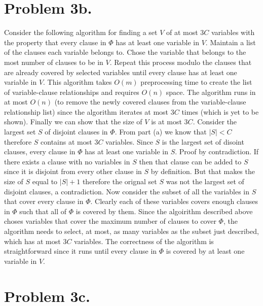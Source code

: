 \documentclass[12pt]{article}
\begin{document}
\section*{Problem 3b.}
Consider the following algorithm for finding a set $V$ of at most $3C$ variables
with the property that every clause in $\Phi$ has at least one variable in $V$.
Maintain a list of the clauses each variable belongs to. Chose the variable that
belongs to the most number of clauses to be in $V$. Repeat this process modulo
the clauses that are already covered by selected variables until every clause
has at least one variable in $V$. This algorithm takes $O(m)$ preprocessing time
to create the list of variable-clause relationships and requires $O(n)$ space.
The algorithm runs in at most $O(n)$ (to remove the newly covered clauses from
the variable-clause relationship list) since the algorithm iterates at most $3C$
times (which is yet to be shown). Finally we can show that the size of $V$ is at
most $3C$. Consider the largest set $S$ of disjoint clauses in $\Phi$. From
part (a) we know that $|S| < C$ therefore $S$ contains at most $3C$ variables.
Since $S$ is the largest set of disoint clauses, every clause in $\Phi$ has at
least one variable in $S$. Proof by contradiction. If there exists a clause with
no variables in $S$ then that clause can be added to $S$ since it is disjoint
from every other clause in $S$ by definition. But that makes the size of
$S$ equal to $|S|+1$ therefore the orignal set $S$ was not the largest set of
disjoint clauses, a contradiction. Now consider the subset of all the variables
in $S$ that cover every clause in $\Phi$. Clearly each of these variables covers
enough clauses in $\Phi$ such that all of $\Phi$ is covered by them. Since the
algoirithm described above choses variables that cover the maximum number of
clauses to cover $\Phi$, the algorithm needs to select, at most, as many variables
as the subset just described, which has at most $3C$ variables. The correctness
of the algorithm is straightforward since it runs until every clause in $\Phi$
is covered by at least one variable in $V$.

\section*{Problem 3c.}
\end{document}
